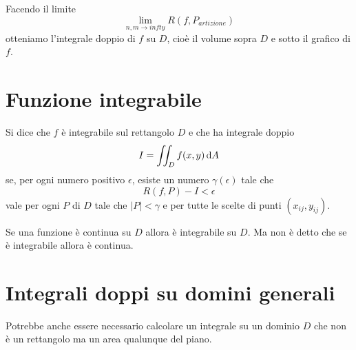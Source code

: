 Facendo il limite
$$\lim_{n,m \to infty} R(f,P_{artizione})$$ otteniamo l'integrale doppio di $f$ su $D$, cioè il volume sopra $D$ e sotto il grafico di $f$.


\section{Funzione integrabile}

\begin{definition}
Si dice che $f$ è integrabile sul rettangolo $D$ e che ha integrale doppio $$I = \iint_D f(x,y) \mathop{}\!\mathrm{d} A$$
se, per ogni numero positivo $\epsilon$, esiste un numero $\gamma(\epsilon)$ tale  che $$R(f,P)-I<\epsilon$$ vale per ogni $P$ di $D$ tale che $|P|<\gamma$ e per tutte le scelte di punti $(x_{ij},y_{ij})$.
\end{definition}

\begin{property}
Se una funzione è continua su $D$ allora è integrabile su $D$. Ma non è detto che se è integrabile allora è continua.
\end{property}

\section{Integrali doppi su domini generali}

Potrebbe anche essere necessario calcolare un integrale su un dominio $D$ che non è un rettangolo ma un area qualunque del piano.



